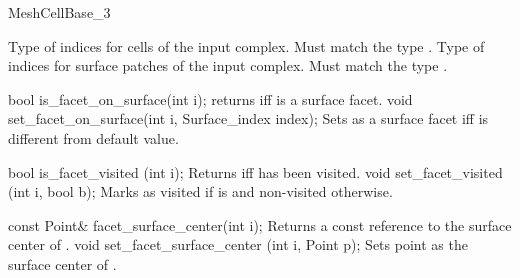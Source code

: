 \begin{ccRefConcept}{MeshCellBase_3}

{Type of indices for cells of the input complex. Must match the type .}
\ccGlue
{}
{Type of indices for surface patches of the input complex. Must match the type .}


\ccOperations



\ccMethod
{bool is_facet_on_surface(int i);}
{returns  iff  is a surface facet. }
\ccGlue
\ccMethod
{void set_facet_on_surface(int i, Surface_index index);}
{Sets  as a surface facet  iff  is
  different from  default value.}

\ccMethod
{bool is_facet_visited (int i);}
{Returns  iff  has been visited.}
\ccGlue
\ccMethod
{void set_facet_visited (int i, bool b);} 
{Marks  as visited if  is 
 and non-visited otherwise.}

\ccMethod
{const Point& facet_surface_center(int i);}
{Returns a const reference to the surface center of .}
\ccGlue
\ccMethod
{void set_facet_surface_center (int i, Point p);} 
{Sets point  as the surface center of .}


\ccHasModels
{}


\ccSeeAlso

 \\
 \\

\end{ccRefConcept}

\ccRefPageEnd

